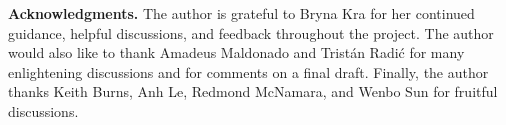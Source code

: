 \documentclass[12pt]{amsart}
\theoremstyle{definition}
\theoremstyle{plain}
\newtheorem{corollary}[theorem]{Corollary}
\theoremstyle{definition}
\numberwithin{equation}{section}
\begin{document}
\medskip

\noindent\textbf{Acknowledgments.} 
The author is grateful to Bryna Kra for her continued guidance, helpful discussions, and feedback throughout the project. The author would also like to thank Amadeus Maldonado and Trist\'an Radi\'c for many enlightening discussions and for comments on a final draft. Finally, the author thanks Keith Burns, Anh Le, Redmond McNamara, and Wenbo Sun for fruitful discussions.


     
     
     

\end{document}
